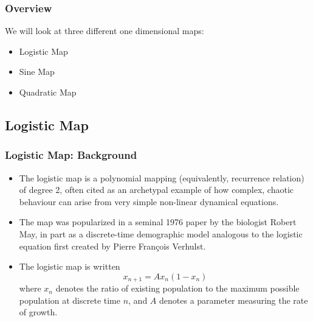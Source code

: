 \documentclass[
	11pt, %
	aspectratio=169, %
]{beamer}
\begin{document}

\begin{frame}
	\frametitle{Overview}

    We will look at three different one dimensional maps: \pause

    \begin{itemize}
        \item Logistic Map \pause
        \item Sine Map \pause
        \item Quadratic Map
    \end{itemize}

\end{frame}


\subsection{Logistic Map}

\begin{frame}
	\frametitle{Logistic Map: Background}
    
        \begin{itemize}
            \item The logistic map is a polynomial mapping (equivalently, recurrence relation) of degree 2, often cited as an archetypal example of how complex, chaotic behaviour can arise from very simple non-linear dynamical equations. \pause
            \item The map was popularized in a seminal 1976 paper by the biologist Robert May, in part as a discrete-time demographic model analogous to the logistic equation first created by Pierre François Verhulst. \pause
            \item The logistic map is written
            \begin{equation}
                x_{n+1} = Ax_n(1-x_n)
            \end{equation}
            where $x_n$ denotes the ratio of existing population to the maximum possible population at discrete time $n$, and $A$ denotes a parameter measuring the rate of growth.
        \end{itemize}

\end{frame}

\end{document}
